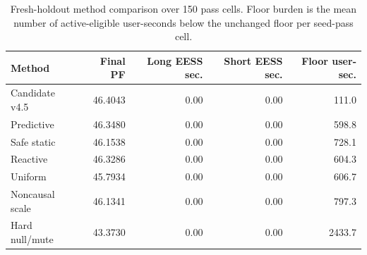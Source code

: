 \begin{table}[t]
\caption{Fresh-holdout method comparison over 150 pass cells. Floor burden is the mean number of active-eligible user-seconds below the unchanged floor per seed-pass cell.}
\label{tab:method-comparison}
\centering
\footnotesize
\setlength{\tabcolsep}{5.0pt}
\renewcommand{\arraystretch}{1.08}
\begin{tabular}{@{}lrrrr@{}}
\toprule
Method & Final PF & Long EESS sec. & Short EESS sec. & Floor user-sec.\\
\midrule
Candidate v4.5 & 46.4043 & 0.00 & 0.00 & 111.0\\
Predictive & 46.3480 & 0.00 & 0.00 & 598.8\\
Safe static & 46.1538 & 0.00 & 0.00 & 728.1\\
Reactive & 46.3286 & 0.00 & 0.00 & 604.3\\
Uniform & 45.7934 & 0.00 & 0.00 & 606.7\\
Noncausal scale & 46.1341 & 0.00 & 0.00 & 797.3\\
Hard null/mute & 43.3730 & 0.00 & 0.00 & 2433.7\\
\bottomrule
\end{tabular}
\end{table}
